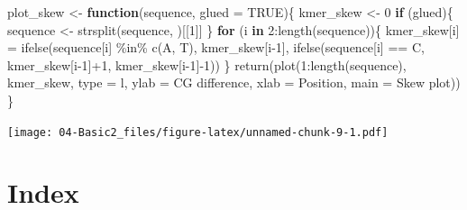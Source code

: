 \documentclass[
]{book}
\newenvironment{Shaded}{\begin{snugshade}}{\end{snugshade}}
\newcommand{\AttributeTok}[1]{\textcolor[rgb]{0.77,0.63,0.00}{#1}}
\newcommand{\ConstantTok}[1]{\textcolor[rgb]{0.00,0.00,0.00}{#1}}
\newcommand{\ControlFlowTok}[1]{\textcolor[rgb]{0.13,0.29,0.53}{\textbf{#1}}}
\newcommand{\DecValTok}[1]{\textcolor[rgb]{0.00,0.00,0.81}{#1}}
\newcommand{\FunctionTok}[1]{\textcolor[rgb]{0.00,0.00,0.00}{#1}}
\newcommand{\NormalTok}[1]{#1}
\newcommand{\OtherTok}[1]{\textcolor[rgb]{0.56,0.35,0.01}{#1}}
\newcommand{\SpecialCharTok}[1]{\textcolor[rgb]{0.00,0.00,0.00}{#1}}
\newcommand{\StringTok}[1]{\textcolor[rgb]{0.31,0.60,0.02}{#1}}
\begin{document}
\begin{Shaded}
\begin{Highlighting}[]
\NormalTok{plot\_skew }\OtherTok{\textless{}{-}} \ControlFlowTok{function}\NormalTok{(sequence, }\AttributeTok{glued =} \ConstantTok{TRUE}\NormalTok{)\{}
\NormalTok{  kmer\_skew }\OtherTok{\textless{}{-}} \DecValTok{0}
  \ControlFlowTok{if}\NormalTok{ (glued)\{}
\NormalTok{    sequence }\OtherTok{\textless{}{-}} \FunctionTok{strsplit}\NormalTok{(sequence, }\StringTok{\textquotesingle{}\textquotesingle{}}\NormalTok{)[[}\DecValTok{1}\NormalTok{]]}
\NormalTok{  \}}
  \ControlFlowTok{for}\NormalTok{ (i }\ControlFlowTok{in} \DecValTok{2}\SpecialCharTok{:}\FunctionTok{length}\NormalTok{(sequence))\{}
\NormalTok{    kmer\_skew[i] }\OtherTok{=} \FunctionTok{ifelse}\NormalTok{(sequence[i] }\SpecialCharTok{\%in\%} \FunctionTok{c}\NormalTok{(}\StringTok{\textquotesingle{}A\textquotesingle{}}\NormalTok{, }\StringTok{\textquotesingle{}T\textquotesingle{}}\NormalTok{), kmer\_skew[i}\DecValTok{{-}1}\NormalTok{],}
                     \FunctionTok{ifelse}\NormalTok{(sequence[i] }\SpecialCharTok{==} \StringTok{\textquotesingle{}C\textquotesingle{}}\NormalTok{, kmer\_skew[i}\DecValTok{{-}1}\NormalTok{]}\SpecialCharTok{+}\DecValTok{1}\NormalTok{, kmer\_skew[i}\DecValTok{{-}1}\NormalTok{]}\SpecialCharTok{{-}}\DecValTok{1}\NormalTok{))}
\NormalTok{  \}}
  \FunctionTok{return}\NormalTok{(}\FunctionTok{plot}\NormalTok{(}\DecValTok{1}\SpecialCharTok{:}\FunctionTok{length}\NormalTok{(sequence), kmer\_skew, }\AttributeTok{type =} \StringTok{\textquotesingle{}l\textquotesingle{}}\NormalTok{, }
              \AttributeTok{ylab =} \StringTok{\textquotesingle{}CG difference\textquotesingle{}}\NormalTok{, }\AttributeTok{xlab =} \StringTok{\textquotesingle{}Position\textquotesingle{}}\NormalTok{,}
              \AttributeTok{main =} \StringTok{\textquotesingle{}Skew plot\textquotesingle{}}\NormalTok{))}
\NormalTok{\}}
\end{Highlighting}
\end{Shaded}

\begin{Shaded}
\end{Shaded}

\texttt{[image: 04-Basic2\_files/figure-latex/unnamed-chunk-9-1.pdf]}

\hypertarget{index}{%
\section{Index}\label{index}}
\end{document}
